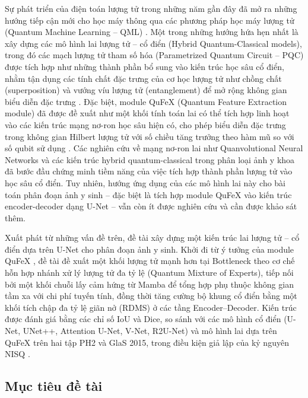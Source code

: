 \documentclass[14pt]{article}  %
\begin{document}
{    Sự phát triển của điện toán lượng tử trong những năm gần đây đã mở ra những hướng tiếp cận mới cho học máy thông qua các phương pháp học máy lượng tử (Quantum Machine Learning -- QML) \cite{biamonte2017qml}. Một trong những hướng hứa hẹn nhất là xây dựng các mô hình lai lượng tử -- cổ điển (Hybrid Quantum-Classical models), trong đó các mạch lượng tử tham số hóa (Parametrized Quantum Circuit -- PQC) được tích hợp như những thành phần bổ sung vào kiến trúc học sâu cổ điển, nhằm tận dụng các tính chất đặc trưng của cơ học lượng tử như chồng chất (superposition) và vướng víu lượng tử (entanglement) để mở rộng không gian biểu diễn đặc trưng \cite{du2025qmltutorial}. Đặc biệt, module QuFeX (Quantum Feature Extraction module) đã được đề xuất như một khối tính toán lai có thể tích hợp linh hoạt vào các kiến trúc mạng nơ-ron học sâu hiện có, cho phép biểu diễn đặc trưng trong không gian Hilbert lượng tử với số chiều tăng trưởng theo hàm mũ so với số qubit sử dụng \cite{qufex2025}. Các nghiên cứu về mạng nơ-ron lai như Quanvolutional Neural Networks \cite{henderson2020quanvolution} và các kiến trúc hybrid quantum-classical trong phân loại ảnh y khoa \cite{shahjalal2025hqcnn} đã bước đầu chứng minh tiềm năng của việc tích hợp thành phần lượng tử vào học sâu cổ điển. Tuy nhiên, hướng ứng dụng của các mô hình lai này cho bài toán phân đoạn ảnh y sinh -- đặc biệt là tích hợp module QuFeX vào kiến trúc encoder-decoder dạng U-Net -- vẫn còn ít được nghiên cứu và cần được khảo sát thêm.

    Xuất phát từ những vấn đề trên, đề tài xây dựng một kiến trúc lai lượng tử -- cổ điển dựa trên U-Net cho phân đoạn ảnh y sinh. Khởi đi từ ý tưởng của module QuFeX \cite{qufex2025}, đề tài đề xuất một khối lượng tử mạnh hơn tại Bottleneck theo cơ chế hỗn hợp nhánh xử lý lượng tử đa tỷ lệ (Quantum Mixture of Experts), tiếp nối bởi một khối chuỗi lấy cảm hứng từ Mamba \cite{gu2023mamba} để tổng hợp phụ thuộc không gian tầm xa với chi phí tuyến tính, đồng thời tăng cường bộ khung cổ điển bằng một khối tích chập đa tỷ lệ giãn nở (RDMS) ở các tầng Encoder--Decoder. Kiến trúc được đánh giá bằng các chỉ số IoU và Dice, so sánh với các mô hình cổ điển (U-Net, UNet++, Attention U-Net, V-Net, R2U-Net) và mô hình lai dựa trên QuFeX trên hai tập PH2 và GlaS 2015, trong điều kiện giả lập của kỷ nguyên NISQ \cite{vu2025quantum}.

    \subsection{Mục tiêu đề tài}

}
\end{document}
